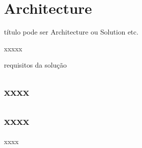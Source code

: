 \section{Architecture}
\label{sec:Architecture}


título pode ser Architecture ou Solution etc.

xxxxx

requisitos da solução

\subsection{xxxx}
\label{subsec:xxxxx}


\subsection{xxxx}
\label{subsec:xxxxx}



xxxx